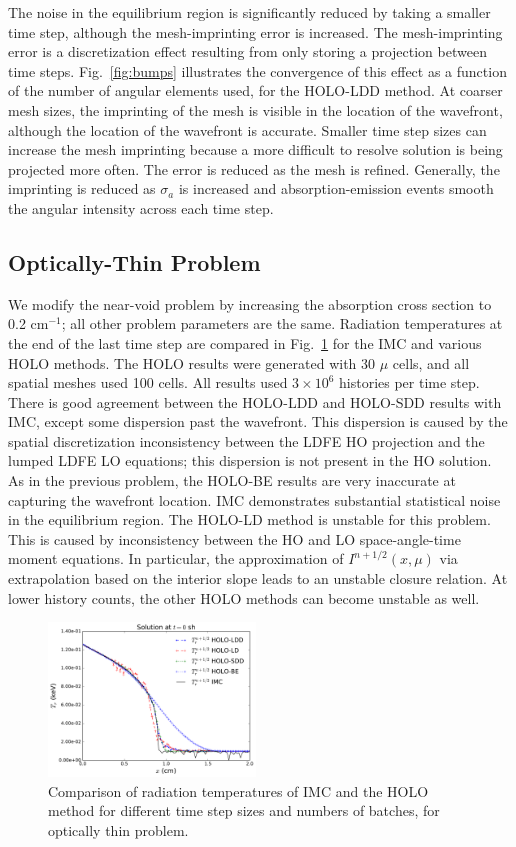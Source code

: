 \documentclass{anstrans}
\newcommand{\invcm}[0]{cm$^{-1}$}
\begin{document}
The noise in the equilibrium region is significantly reduced by taking a smaller time step, although
the mesh-imprinting error is increased.  The mesh-imprinting error is a discretization effect
resulting from only storing a projection between time steps.  
Fig.~\ref{fig:bumps} illustrates the convergence of this
effect as a function of the number of angular elements used, for the HOLO-LDD method.
At coarser mesh sizes, the imprinting of the mesh is visible in the location of
the wavefront, although the location of the wavefront is accurate.  
Smaller time step sizes can increase the mesh imprinting because a more difficult to resolve solution is being projected
more often.  The error is reduced as the mesh is refined.  Generally, the imprinting is reduced as $\sigma_a$ is increased and
absorption-emission events smooth the angular intensity across each time step.


\subsection{Optically-Thin Problem}

We modify the near-void problem by increasing the absorption cross section to 0.2
\invcm; all other problem parameters are the same.  Radiation temperatures at the end of
the last time step are compared in Fig.~\ref{fig:thin_temp_compare} for the IMC and various HOLO
methods. The HOLO results were generated with 30
$\mu$ cells, and all spatial meshes used 100 cells.  All results used $3\times10^6$
histories per time step.   There is good agreement between
the HOLO-LDD and HOLO-SDD results with IMC, except some dispersion past the wavefront.
This dispersion is caused by the spatial discretization inconsistency between the LDFE HO projection and the
lumped LDFE LO equations; this dispersion is not present in the HO solution. 
As in the previous problem, the HOLO-BE results are very
inaccurate at capturing the wavefront location. 
IMC demonstrates substantial statistical noise in the equilibrium region.
The HOLO-LD method is unstable for this problem.  This is caused by inconsistency between the HO and
LO space-angle-time moment equations.  In particular, the approximation of $I^{n+1/2}(x,\mu)$ via extrapolation based on the
interior slope leads to an unstable closure relation.   At lower history counts, the other HOLO
methods can become unstable as well.
\begin{figure}[h!]
  \centering
    \includegraphics[width=0.49\textwidth]{thin_temp_compare.pdf}
    \caption{\label{fig:thin_temp_compare} Comparison of radiation temperatures of IMC and
    the HOLO method for different time step sizes and numbers of batches, for optically
thin problem. }
\end{figure}
\end{document}
